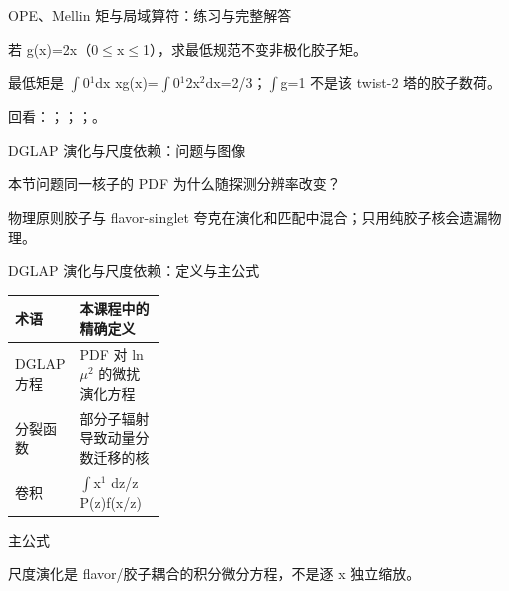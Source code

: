 \begin{frame}[t]{OPE、Mellin 矩与局域算符：练习与完整解答}
\footnotesize
\begin{block}{}若 g(x)=2x（0\ensuremath{\le}x\ensuremath{\le}1），求最低规范不变非极化胶子矩。\end{block}
\begin{exampleblock}{}最低矩是 \ensuremath{\int}0\ensuremath{^{1}}dx xg(x)=\ensuremath{\int}0\ensuremath{^{1}}2x\ensuremath{^{2}}dx=2/\allowbreak{}3；\ensuremath{\int}g=1 不是该 twist-2 塔的胶子数荷。\end{exampleblock}
\vfill
\scriptsize 回看：；；；。
\end{frame}

\begin{frame}[t]{DGLAP 演化与尺度依赖：问题与图像}
\footnotesize
\begin{block}{本节问题}同一核子的 PDF 为什么随探测分辨率改变？\end{block}
\begin{block}{物理原则}\quad 胶子与 flavor-singlet 夸克在演化和匹配中混合；只用纯胶子核会遗漏物理。\end{block}
\end{frame}

\begin{frame}[t]{DGLAP 演化与尺度依赖：定义与主公式}
\footnotesize\begin{tabularx}{\linewidth}{p{0.30\linewidth}Y}
\toprule 术语 & 本课程中的精确定义\\\midrule
{} DGLAP 方程 & PDF 对 ln\ensuremath{\mu}\ensuremath{^{2}} 的微扰演化方程\\
 分裂函数 & 部分子辐射导致动量分数迁移的核\\
 卷积 & \ensuremath{\int}x\ensuremath{^{1}} dz/\allowbreak{}z P(z)f(x/\allowbreak{}z)\\
\bottomrule\end{tabularx}\vspace{0.15cm}
\begin{block}{ 主公式}\centering{}\end{block}
尺度演化是 flavor/\allowbreak{}胶子耦合的积分微分方程，不是逐 x 独立缩放。
\end{frame}

